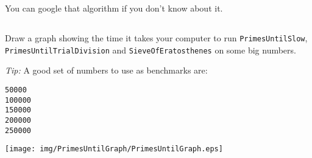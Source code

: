 \documentclass[a4paper, 12pt]{article}
\begin{document}
You can google that algorithm if you don't know about it.


\subsection{}

Draw a graph showing the time it takes your computer to run
\texttt{PrimesUntilSlow}, \\\texttt{PrimesUntilTrialDivision} and
\texttt{SieveOfEratosthenes} on some big numbers.

\textsl{Tip:} A good set of numbers to use as benchmarks are:

\begin{verbatim}
50000
100000
150000
200000
250000
\end{verbatim}

\begin{solution}
  \centering
  \texttt{[image: img/PrimesUntilGraph/PrimesUntilGraph.eps]}
\end{solution}
\end{document}
